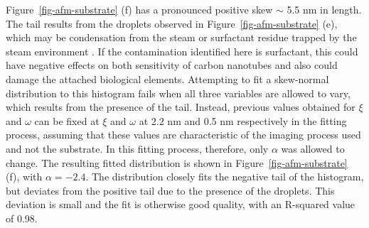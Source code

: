 \documentclass[
  a4paper,
]{scrbook}
\begin{document}
Figure~\ref{fig-afm-substrate} (f) has a pronounced positive skew
\(\sim\) 5.5 nm in length. The tail results from the droplets observed
in Figure~\ref{fig-afm-substrate} (e), which may be condensation from
the steam or surfactant residue trapped by the steam environment
\autocite{Christensen2022,Vobornik2023}. If the contamination identified
here is surfactant, this could have negative effects on both sensitivity
of carbon nanotubes and also could damage the attached biological
elements. Attempting to fit a skew-normal distribution to this histogram
fails when all three variables are allowed to vary, which results from
the presence of the tail. Instead, previous values obtained for \(\xi\)
and \(\omega\) can be fixed at \(\xi\) and \(\omega\) at 2.2 nm and 0.5
nm respectively in the fitting process, assuming that these values are
characteristic of the imaging process used and not the substrate. In
this fitting process, therefore, only \(\alpha\) was allowed to change.
The resulting fitted distribution is shown in
Figure~\ref{fig-afm-substrate} (f), with \(\alpha = -2.4\). The
distribution closely fits the negative tail of the histogram, but
deviates from the positive tail due to the presence of the droplets.
This deviation is small and the fit is otherwise good quality, with an
R-squared value of 0.98.
\end{document}

